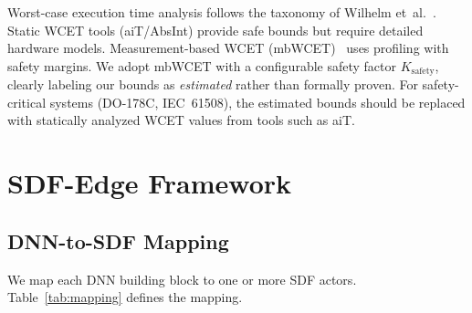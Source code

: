 \documentclass[journal]{IEEEtran}
\begin{document}
Worst-case execution time analysis follows the taxonomy of Wilhelm et~al.~\cite{wilhelm2008wcet}.
Static WCET tools (aiT/AbsInt) provide safe bounds but require detailed hardware models.
Measurement-based WCET (mbWCET)~\cite{wenzel2005mbwcet} uses profiling with safety margins.
We adopt mbWCET with a configurable safety factor $K_{\mathrm{safety}}$, clearly labeling our bounds as \emph{estimated} rather than formally proven.
For safety-critical systems (DO-178C, IEC~61508), the estimated bounds should be replaced with statically analyzed WCET values from tools such as aiT.

\section{SDF-Edge Framework}

\subsection{DNN-to-SDF Mapping}

We map each DNN building block to one or more SDF actors.
Table~\ref{tab:mapping} defines the mapping.

\begin{table}[htbp]
\centering
\caption{DNN-to-SDF Actor Mapping. Rates refer to the number of \emph{spatial tile groups} (contiguous row-blocks of the feature map) produced/consumed per firing. For single-rate actors ($p = c = 1$), one firing processes one tile group; for multi-rate actors, the rate mismatch reflects spatial dimension changes due to strided operations.}
\label{tab:mapping}
\end{table}
\end{document}
